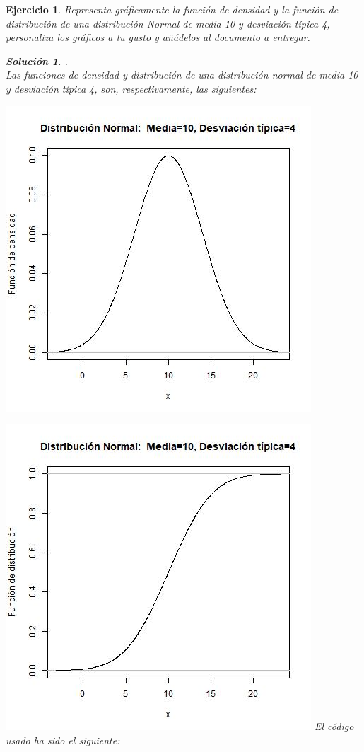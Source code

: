 \documentclass[11pt, a4paper]{article}
\newif\IfInSansMode
\theoremstyle{theorem-style}
\theoremstyle{definition-style}
\newtheorem{ejer}{Ejercicio}[section]
\theoremstyle{remark-style}
\newtheorem*{sol}{Solución}
\theoremstyle{example-style}
\begin{document}
\begin{ejer}

Representa gráficamente la función de densidad y la función de distribución de una distribución Normal de media 10 y desviación típica 4, personaliza los gráficos a tu gusto y añádelos al documento a entregar.

\begin{sol}
	
.\\

Las funciones de densidad y distribución de una distribución normal de media 10 y desviación típica 4, son, respectivamente, las siguientes:
	
\includegraphics[]{FDensidad.jpg}

\includegraphics[]{FDistribucion.jpg}
El código usado ha sido el siguiente:


\end{sol}
\end{ejer}
\end{document}
